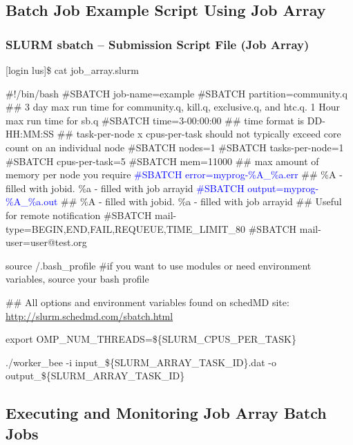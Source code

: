 \subsection{Batch Job Example Script Using Job Array}
\begin{frame}[fragile]
\frametitle{SLURM sbatch -- Submission Script File (Job Array)}
\begin{semiverbatim}\tiny
[login lus]\$ cat job_array.slurm

\#!/bin/bash
\#SBATCH \ddash{}job-name=example
\#SBATCH \ddash{}partition=community.q
\#\# 3 day max run time for community.q, kill.q, exclusive.q, and htc.q.  1 Hour max run time for sb.q
\#SBATCH \ddash{}time=3-00:00:00 ## time format is DD-HH:MM:SS
\#\# task-per-node x cpus-per-task should not typically exceed core count on an individual node 
\#SBATCH \ddash{}nodes=1
\#SBATCH \ddash{}tasks-per-node=1
\#SBATCH \ddash{}cpus-per-task=5
\#SBATCH \ddash{}mem=11000 \#\# max amount of memory per node you require
\textcolor{blue}{\#SBATCH \ddash{}error=myprog-\%A\_\%a.err} \#\# \%A - filled with jobid. \%a - filled with job arrayid
\textcolor{blue}{\#SBATCH \ddash{}output=myprog-\%A\_\%a.out} \#\# \%A - filled with jobid. \%a - filled with job arrayid
\#\# Useful for remote notification
\#SBATCH \ddash{}mail-type=BEGIN,END,FAIL,REQUEUE,TIME\_LIMIT\_80
\#SBATCH \ddash{}mail-user=user@test.org

source \ctilde/.bash_profile \#if you want to use modules or need environment variables, source your bash profile

\#\# All options and environment variables found on schedMD site: \href{http://slurm.schedmd.com/sbatch.html}{http://slurm.schedmd.com/sbatch.html}

export OMP\_NUM\_THREADS=\$\{SLURM\_CPUS\_PER\_TASK\}

./worker\_bee -i input\_\$\{SLURM_ARRAY_TASK_ID\}.dat -o output\_\$\{SLURM_ARRAY_TASK_ID\}
\end{semiverbatim}
\end{frame}



\subsection{Executing and Monitoring Job Array Batch Jobs}

